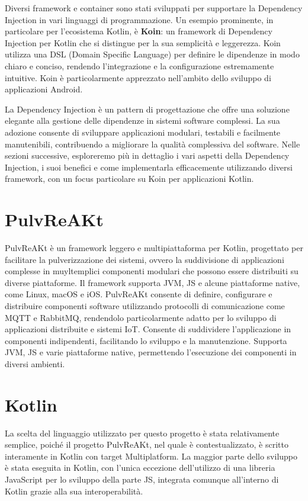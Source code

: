 \documentclass[12pt,a4paper,openright,twoside]{book}
\begin{document}
Diversi framework e container sono stati sviluppati per supportare la Dependency Injection in vari linguaggi di programmazione. Un esempio prominente, 
 in particolare per l'ecosistema Kotlin, è \textbf{Koin}: un framework di Dependency Injection per Kotlin che si distingue per la sua semplicità e leggerezza. 
 Koin utilizza una DSL (Domain Specific Language) per definire le dipendenze in modo chiaro e conciso, rendendo l'integrazione e la configurazione estremamente intuitive.
 Koin è particolarmente apprezzato nell'ambito dello sviluppo di applicazioni Android.

La Dependency Injection è un pattern di progettazione che offre una soluzione elegante alla gestione delle dipendenze in sistemi software complessi.
 La sua adozione consente di sviluppare applicazioni modulari, testabili e facilmente manutenibili, contribuendo a migliorare la qualità complessiva del software.
 Nelle sezioni successive, esploreremo più in dettaglio i vari aspetti della Dependency Injection, i suoi benefici e come implementarla efficacemente utilizzando diversi framework,
 con un focus particolare su Koin per applicazioni Kotlin.
    
 \section{PulvReAKt}
PulvReAKt è un framework leggero e multipiattaforma per Kotlin, progettato per facilitare la pulverizzazione dei sistemi, ovvero la suddivisione di applicazioni complesse
 in muyltemplici componenti modulari che possono essere distribuiti su diverse piattaforme. Il framework supporta \ac{JVM}, \ac{JS} e alcune piattaforme native, come Linux, macOS e iOS. 
 PulvReAKt consente di definire, configurare e distribuire componenti software utilizzando protocolli di comunicazione come \ac{MQTT} e RabbitMQ, rendendolo particolarmente adatto 
 per lo sviluppo di applicazioni distribuite e sistemi \ac{IoT}. Consente di suddividere l'applicazione in componenti indipendenti, facilitando lo sviluppo e la manutenzione. 
 Supporta \ac{JVM}, \ac{JS} e varie piattaforme native, permettendo l'esecuzione dei componenti in diversi ambienti.
 
\section{Kotlin}
La scelta del linguaggio utilizzato per questo progetto è stata relativamente semplice, poiché il progetto PulvReAKt, nel quale è contestualizzato, 
è scritto interamente in Kotlin con target Multiplatform. La maggior parte dello sviluppo è stata eseguita in Kotlin, con l'unica eccezione dell'utilizzo di una libreria 
JavaScript per lo sviluppo della parte \ac{JS}, integrata comunque all'interno di Kotlin grazie alla sua interoperabilità.
\end{document}
